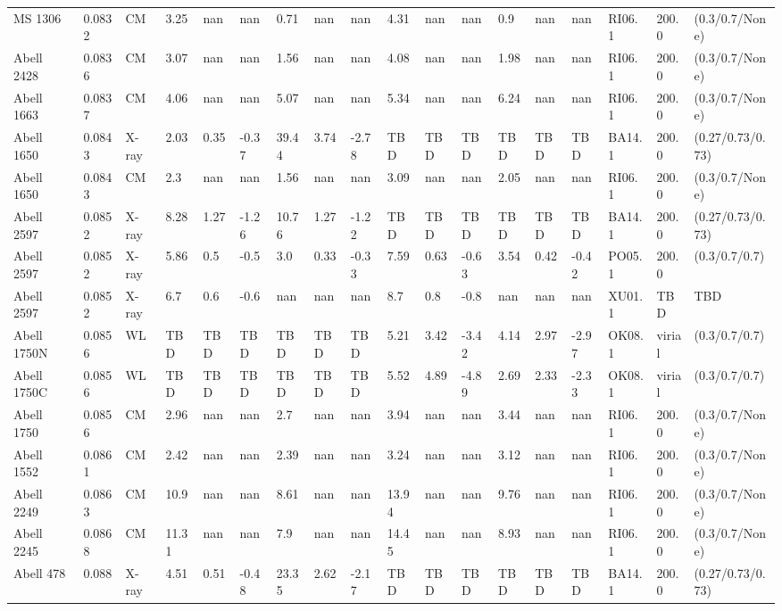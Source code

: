 \documentclass{article}
\begin{document}
\begin{center}
\begin{landscape}
\begin{longtable}{llllllllllllllllll}
MS 1306 & 0.0832 & CM & 3.25 & nan & nan & 0.71 & nan & nan & 4.31 & nan & nan & 0.9 & nan & nan & RI06.1 & 200.0 & (0.3/0.7/None) \\
Abell 2428 & 0.0836 & CM & 3.07 & nan & nan & 1.56 & nan & nan & 4.08 & nan & nan & 1.98 & nan & nan & RI06.1 & 200.0 & (0.3/0.7/None) \\
Abell 1663 & 0.0837 & CM & 4.06 & nan & nan & 5.07 & nan & nan & 5.34 & nan & nan & 6.24 & nan & nan & RI06.1 & 200.0 & (0.3/0.7/None) \\
Abell 1650 & 0.0843 & X-ray & 2.03 & 0.35 & -0.37 & 39.44 & 3.74 & -2.78 & TBD & TBD & TBD & TBD & TBD & TBD & BA14.1 & 200.0 & (0.27/0.73/0.73) \\
Abell 1650 & 0.0843 & CM & 2.3 & nan & nan & 1.56 & nan & nan & 3.09 & nan & nan & 2.05 & nan & nan & RI06.1 & 200.0 & (0.3/0.7/None) \\
Abell 2597 & 0.0852 & X-ray & 8.28 & 1.27 & -1.26 & 10.76 & 1.27 & -1.22 & TBD & TBD & TBD & TBD & TBD & TBD & BA14.1 & 200.0 & (0.27/0.73/0.73) \\
Abell 2597 & 0.0852 & X-ray & 5.86 & 0.5 & -0.5 & 3.0 & 0.33 & -0.33 & 7.59 & 0.63 & -0.63 & 3.54 & 0.42 & -0.42 & PO05.1 & 200.0 & (0.3/0.7/0.7) \\
Abell 2597 & 0.0852 & X-ray & 6.7 & 0.6 & -0.6 & nan & nan & nan & 8.7 & 0.8 & -0.8 & nan & nan & nan & XU01.1 & TBD & TBD \\
Abell 1750N & 0.0856 & WL & TBD & TBD & TBD & TBD & TBD & TBD & 5.21 & 3.42 & -3.42 & 4.14 & 2.97 & -2.97 & OK08.1 & virial & (0.3/0.7/0.7) \\
Abell 1750C & 0.0856 & WL & TBD & TBD & TBD & TBD & TBD & TBD & 5.52 & 4.89 & -4.89 & 2.69 & 2.33 & -2.33 & OK08.1 & virial & (0.3/0.7/0.7) \\
Abell 1750 & 0.0856 & CM & 2.96 & nan & nan & 2.7 & nan & nan & 3.94 & nan & nan & 3.44 & nan & nan & RI06.1 & 200.0 & (0.3/0.7/None) \\
Abell 1552 & 0.0861 & CM & 2.42 & nan & nan & 2.39 & nan & nan & 3.24 & nan & nan & 3.12 & nan & nan & RI06.1 & 200.0 & (0.3/0.7/None) \\
Abell 2249 & 0.0863 & CM & 10.9 & nan & nan & 8.61 & nan & nan & 13.94 & nan & nan & 9.76 & nan & nan & RI06.1 & 200.0 & (0.3/0.7/None) \\
Abell 2245 & 0.0868 & CM & 11.31 & nan & nan & 7.9 & nan & nan & 14.45 & nan & nan & 8.93 & nan & nan & RI06.1 & 200.0 & (0.3/0.7/None) \\
Abell 478 & 0.088 & X-ray & 4.51 & 0.51 & -0.48 & 23.35 & 2.62 & -2.17 & TBD & TBD & TBD & TBD & TBD & TBD & BA14.1 & 200.0 & (0.27/0.73/0.73) \\

\end{longtable}
\end{landscape}
\end{center}
\end{document}
